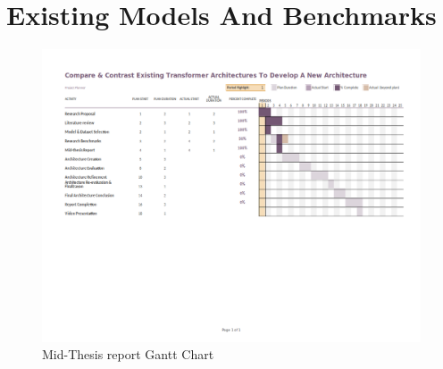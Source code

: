 \documentclass[12pt]{report}
\begin{document}
    \section{Existing Models And Benchmarks}\label{c33}
    \begin{appendices}
    \begin{figure}[!h]
       	\centering
        \includegraphics[scale=0.55,angle=90]{../images/GanttChart-mid.png}
     	\caption{Mid-Thesis report Gantt Chart}\label{ganttChartMid}
    \end{figure}
    \end{appendices}

\end{document}
